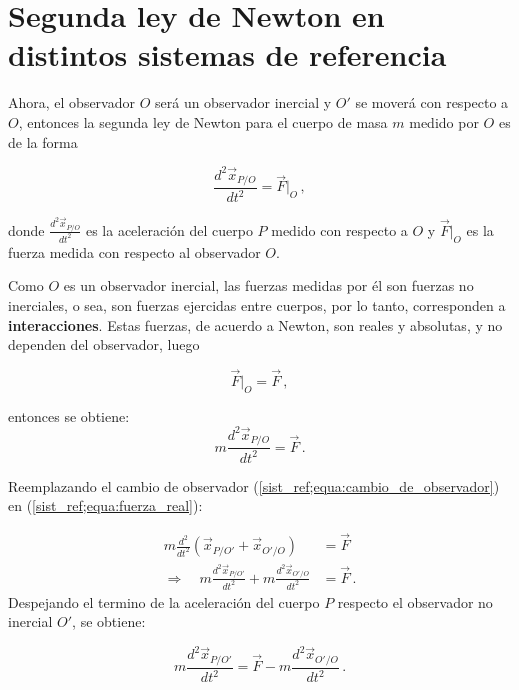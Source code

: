 \documentclass[../apunte_mecanica_clasica.tex]{subfiles}%
\begin{document}
\section{Segunda ley de Newton en distintos sistemas de referencia}

Ahora, el observador $O$ será un observador inercial y $O'$ se moverá con respecto a $O$, entonces la segunda ley de Newton para el cuerpo de masa $m$ medido por $O$ es de la forma

\begin{equation*}
    \frac{d^2\vec{x}_{P/O}}{dt^2}=\vec{F}|_{O} \,,
\end{equation*}

donde $\frac{d^2\vec{x}_{P/O}}{dt^2}$ es la aceleración del cuerpo $P$ medido con respecto a $O$ y $\vec{F}|_{O}$ es la fuerza medida con respecto al observador $O$.

Como $O$ es un observador inercial, las fuerzas medidas por él son fuerzas no inerciales, o sea, son fuerzas ejercidas entre cuerpos, por lo tanto, corresponden a \textbf{interacciones}. Estas fuerzas, de acuerdo a Newton, son reales y absolutas, y no dependen del observador, luego

\begin{equation*}
    \vec{F}|_{O}=\vec{F} \,,
\end{equation*}

entonces se obtiene:
\begin{equation}\label{sist_ref;equa:fuerza_real}
    m\frac{d^2\vec{x}_{P/O}}{dt^2}=\vec{F} \,.
\end{equation}

Reemplazando el cambio de observador (\ref{sist_ref;equa:cambio_de_observador}) en (\ref{sist_ref;equa:fuerza_real}):

\begin{align*}
    m\frac{d^2}{dt^2}\left(\vec{x}_{P/O'}+\vec{x}_{O'/O} \right) &= \vec{F} \\[4pt]
       \Rightarrow \quad m\frac{d^2\vec{x}_{P/O'}}{dt^2}+m\frac{d^2\vec{x}_{O'/O}}{dt^2} &= \vec{F}\,.
\end{align*}
Despejando el termino de la aceleración del cuerpo $P$ respecto el observador no inercial $O'$, se obtiene:

\begin{equation}\label{sist_ref;equa:cambio_de_observador_2da_ley_newton}
    m\frac{d^2\vec{x}_{P/O'}}{dt^2} = \vec{F} - m\frac{d^2\vec{x}_{O'/O}}{dt^2} \,.
\end{equation}
\end{document}
